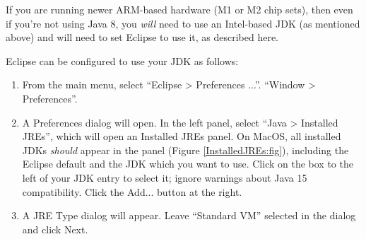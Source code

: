 \ifMacOS
\begin{sideblock}
If you are running newer ARM-based hardware (M1 or M2 chip sets), then
even if you're not using Java 8, you {\it will} need to use an
Intel-based JDK (as mentioned above) and will need to set Eclipse to
use it, as described here.
\end{sideblock}
\fi

Eclipse can be configured to use your JDK as follows:

\begin{enumerate}

\item From the main menu, select 
\ifMacOS
``{\sf Eclipse > Preferences ...}''.
\else
``{\sf Window > Preferences}''.
\fi

\item A {\sf Preferences} dialog will open. In the left panel, select
``{\sf Java > Installed JREs}'', which will open an {\sf Installed JREs}
panel.
\ifMacOS %
On MacOS, all installed JDKs {\it should} appear in the panel
(Figure \ref{InstalledJREs:fig}), including the Eclipse default and
the JDK which you want to use.  Click on the box to the left of
your JDK entry to select it; ignore warnings about Java 15
compatibility.
\else  %
Click the {\sf Add...} button at the right.

\item A {\sf JRE Type} dialog will appear. Leave ``Standard VM''
selected in the dialog and click {\sf Next}.


\end{enumerate}

